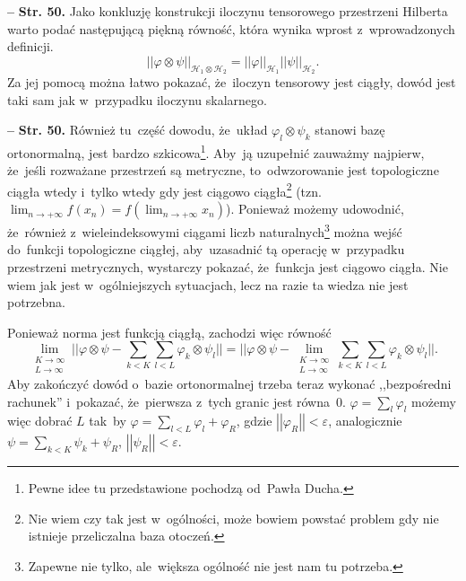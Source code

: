 \documentclass[a4paper,11pt]{article}
\newcommand{\mc}{\mathcal}
\newcommand{\ra}{\rightarrow}
\newcommand{\wtw}{wtedy i~tylko wtedy}
\newcommand{\veps}{\varepsilon}
\newcommand{\vp}{\varphi}
\newcommand{\Hc}{\mc{H}}
\newcommand{\ot}{\otimes}
\newcommand{\Lim}{\lim\limits}
\newcommand{\Sum}{\sum\limits}
\newcommand{\norm}[1]{\left|\left| #1 \right|\right|}
\newcommand{\tb}{\textbf}
\newcommand{\noi}{\noindent}
\newcommand{\start}{\noi \tb{--} {}}
\newcommand{\Str}[1]{\tb{Str. #1.}}
\begin{document}
\start \Str{50} Jako konkluzję konstrukcji iloczynu tensorowego
przestrzeni Hilberta warto podać następującą piękną równość, która
wynika wprost z~wprowadzonych definicji.
\begin{displaymath}
  \norm{ \vp \ot \psi }_{ \Hc_{ 1 } \ot \Hc_{ 2 } }
  = \norm{ \vp }_{ \Hc_{ 1 } } \norm{ \psi }_{ \Hc_{ 2 } }.
\end{displaymath}
Za jej pomocą można łatwo pokazać, że~iloczyn tensorowy jest ciągły,
dowód jest taki sam jak w~przypadku iloczynu skalarnego.


\start \Str{50} Również tu~część dowodu, że~układ
$\vp_{ l } \ot \psi_{ k }$ stanowi bazę ortonormalną, jest bardzo
szkicowa\footnote{Pewne idee tu przedstawione pochodzą od~Pawła
  Ducha.}. Aby~ją uzupełnić zauważmy najpierw, że~jeśli rozważane
przestrzeń są metryczne, to~odwzorowanie jest topologiczne
ciągła %
\wtw%
gdy jest ciągowo ciągła\footnote{Nie wiem czy tak jest w~ogólności,
  może bowiem powstać problem gdy nie istnieje przeliczalna baza
  otoczeń.} (tzn.
$\lim_{ n \ra +\infty } f( x_{ n } ) = f( \lim_{ n \ra +\infty } x_{ n
} )$). Ponieważ możemy udowodnić, że~również z~wieleindeksowymi
ciągami liczb naturalnych\footnote{Zapewne nie tylko, ale~większa
  ogólność nie jest nam tu potrzeba.} można wejść do~funkcji
topologiczne ciągłej, aby~uzasadnić tą operację w~przypadku
przestrzeni metrycznych, wystarczy pokazać, że~funkcja jest ciągowo
ciągła. Nie wiem jak jest w~ogólniejszych sytuacjach, lecz na razie ta
wiedza nie jest potrzebna.

Ponieważ norma jest funkcją ciągłą, zachodzi więc równość
\begin{displaymath}
  \Lim_{ \substack{ K \ra \infty \\ L \ra \infty } } || \vp \ot \psi
  - \Sum_{ k < K }\Sum_{ l < L } \vp_{ k } \ot \psi_{ l } ||
  = || \vp \ot \psi - \Lim_{ \substack{ K \ra \infty \\ L \ra \infty } } \Sum_{ k < K }
  \Sum_{ l < L } \vp_{ k } \ot \psi_{ l } ||.
\end{displaymath}
Aby zakończyć dowód o~bazie ortonormalnej trzeba teraz wykonać
,,bezpośredni rachunek'' i~pokazać, że~pierwsza z~tych granic jest
równa~0. $\vp = \sum_{ l } \vp_{ l }$ możemy więc dobrać $L$ tak~by
$\vp = \sum_{ l < L } \vp_{ l } + \vp_{ R }$, gdzie
$\norm{ \vp_{ R } } < \veps$, analogicznie
$\psi = \sum_{ k < K } \psi_{ k } + \psi_{ R }$,
$\norm{ \psi_{ R } } < \veps$.
\end{document}

